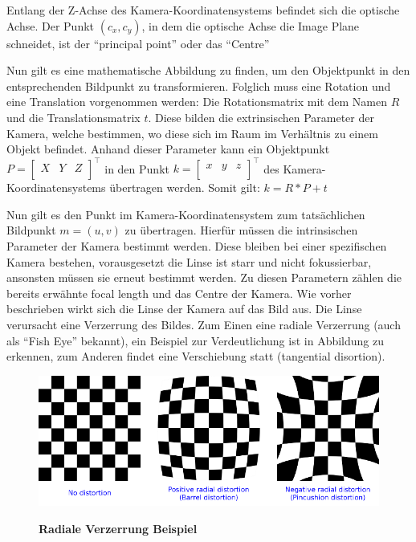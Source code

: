 Entlang der Z-Achse des Kamera-Koordinatensystems befindet sich die optische Achse. Der Punkt $(c_x,c_y)$, in dem die optische Achse die Image Plane schneidet, ist der "`principal point"' oder das "`Centre"' \autocite[8]{Medioni:2004:ETC:993884}

Nun gilt es eine mathematische Abbildung zu finden, um den Objektpunkt in den entsprechenden Bildpunkt zu transformieren. Folglich muss eine Rotation und eine Translation vorgenommen werden:
Die Rotationsmatrix mit dem Namen $R$ und die Translationsmatrix $t$. Diese bilden die extrinsischen Parameter der Kamera, welche bestimmen, wo diese sich im Raum im Verhältnis zu einem Objekt befindet. Anhand dieser Parameter kann ein  Objektpunkt $P = \begin{bmatrix}X & Y& Z \\\end{bmatrix}^\intercal$ in den Punkt $ k = \begin{bmatrix}x & y& z \\\end{bmatrix}^\intercal$ des Kamera-Koordinatensystems übertragen werden. Somit gilt: 
$k = R * P + t$ 

Nun gilt es den Punkt im Kamera-Koordinatensystem zum tatsächlichen Bildpunkt $m=(u,v)$ zu übertragen. Hierfür müssen die intrinsischen Parameter der Kamera bestimmt werden. Diese bleiben bei einer spezifischen Kamera bestehen, vorausgesetzt die Linse ist starr und nicht fokussierbar, ansonsten müssen sie erneut bestimmt werden.
Zu diesen Parametern zählen die bereits erwähnte focal length und das Centre der Kamera. Wie vorher beschrieben wirkt sich die Linse der Kamera auf das Bild aus. Die Linse verursacht eine Verzerrung des Bildes. Zum Einen eine radiale Verzerrung (auch als "`Fish Eye"' bekannt), ein Beispiel zur Verdeutlichung ist in Abbildung  zu erkennen, zum Anderen findet eine Verschiebung statt (tangential disortion).

\begin{figure}
\includegraphics[width=\textwidth]{media/distortion_examples}\\
\caption{\textbf{Radiale Verzerrung Beispiel \autocite{OpencvCamera2016}}
}
\label{Fig:radialdistortion}
\end{figure}

